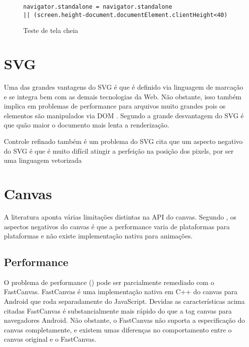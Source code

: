 \begin{figure}[H]
\centering
\begin{verbatim}
navigator.standalone = navigator.standalone 
|| (screen.height-document.documentElement.clientHeight<40)
\end{verbatim}
\caption{Teste de tela cheia}
\label{fig:fixJSTypes}
\end{figure}

\section{SVG}

Uma das grandes vantagens do SVG é que é definido via linguagem
de marcação e se integra bem com as demais tecnologias da Web.
Não obstante, isso também implica em problemas de performance para
arquivos muito grandes pois os elementos são manipulados via DOM
. Segundo \citet{html5mostwanted} a
grande desvantagem do SVG é que quão maior o documento mais lenta a
renderização.

Controle refinado também é um problema do SVG \citet{html5mostwanted}
cita que um aspecto negativo do SVG é que é muito difícil atingir a
perfeição na posição dos pixels, por ser uma linguagem vetorizada

\section{Canvas}

A literatura aponta várias limitações distintas na API do canvas.
Segundo \autocite{html5mostwanted}, os aspectos negativos do canvas é
que a performance varia de plataformas para plataformas e não existe
implementação nativa para animações.

\subsection{Performance}

O problema de performance () pode ser parcialmente remediado
com o FastCanvas. FastCanvas é uma implementação nativa em C++ do
canvas para Android que roda separadamente do JavaScript. Devidas as
características acima citadas FastCanvas é substancialmente mais
rápido do que a tag canvas para navegadores Android. Não obstante, o
FastCanvas não suporta a especificação do canvas completamente, e
existem umas diferenças no comportamento entre o canvas original e o
FastCanvas.

